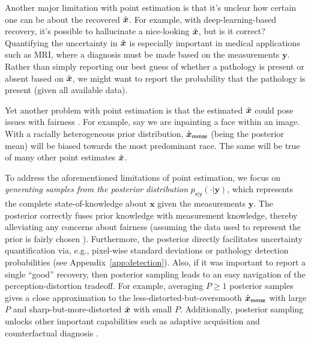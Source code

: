\documentclass{article}
\theoremstyle{plain}
\theoremstyle{definition}
\theoremstyle{remark}
\newcommand{\hvec}[1]{\ensuremath{\Hat{\boldsymbol{#1}}}}
\renewcommand{\vec}[1]{\ensuremath{\boldsymbol{#1}}}
\newcommand{\appref}[1]{Appendix~\ref{app:#1}}
\newcommand{\mmse}{_{\mathsf{mmse}}}
\newcommand{\pxgy}{p_{\mathsf{x}|\mathsf{y}}}
\begin{document}
Another major limitation with point estimation is that it's unclear how certain one can be about the recovered $\hvec{x}$.
For example, with deep-learning-based recovery, it's possible to hallucinate a nice-looking $\hvec{x}$, but is it correct?
Quantifying the uncertainty in \hvec{x} is especially important in medical applications such as MRI, where a diagnosis must be made based on the measurements \vec{y}. 
Rather than simply reporting our best guess of whether a pathology is present or absent based on \hvec{x}, we might want to report the probability that the pathology is present (given all available data).

Yet another problem with point estimation is that the estimated \hvec{x} could pose issues with fairness \cite{Mehrabi:CS:21}. 
For example, say we are inpainting a face within an image. 
With a racially heterogeneous prior distribution, $\hvec{x}\mmse$ (being the posterior mean) will be biased towards the most predominant race.
The same will be true of many other point estimates $\hvec{x}$.

To address the aforementioned limitations of point estimation, we focus on \emph{generating samples from the posterior distribution} $\pxgy(\cdot|\vec{y})$, which represents the complete state-of-knowledge about $\vec{x}$ given the measurements $\vec{y}$.
The posterior correctly fuses prior knowledge with measurement knowledge, thereby alleviating any concerns about fairness (assuming the data used to represent the prior is fairly chosen \cite{Mehrabi:CS:21}).
Furthermore, the posterior directly facilitates uncertainty quantification via, e.g., pixel-wise standard deviations or pathology detection probabilities (see \appref{detection}).  
Also, if it was important to report a single ``good'' recovery, then posterior sampling leads to an easy navigation of the perception-distortion tradeoff.
For example, averaging $P\geq 1$ posterior samples gives a close approximation to the less-distorted-but-oversmooth $\hvec{x}\mmse$ with large $P$ and sharp-but-more-distorted $\hvec{x}$ with small $P$.
Additionally, posterior sampling unlocks other important capabilities such as adaptive acquisition \cite{Sanchez:NIPSW:20} and counterfactual diagnosis \cite{Chang:ICLR:19}.
\end{document}
